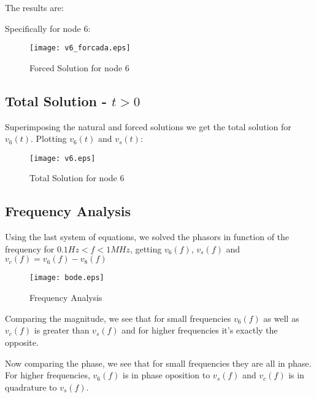 The results are:



Specifically for node 6:

\begin{figure}[h] \centering
\texttt{[image: v6\_forcada.eps]}
\caption{Forced Solution for node 6}
\label{fig:forced}
\end{figure}



\subsection{Total Solution - $t>0$}

Superimposing the natural and forced solutions we get the total solution for $v_{6}(t)$.
Plotting $v_{6}(t)$ and $v_{s}(t)$:

\begin{figure}[h] \centering
\texttt{[image: v6.eps]}
\caption{Total Solution for node 6}
\label{fig:total}
\end{figure}


\subsection{Frequency Analysis}

Using the last system of equations, we solved the phasors in function of the frequency for $0.1Hz<f<1MHz$, getting $v_{6}(f)$, $v_{s}(f)$ and $v_{c}(f)=v_{6}(f)-v_{8}(f)$

\begin{figure}[h] \centering
\texttt{[image: bode.eps]}
\caption{Frequency Analysis}
\label{fig:frequency}
\end{figure}

Comparing the magnitude, we see that for small frequencies  $v_{6}(f)$ as well as $v_{c}(f)$ is greater than $v_{s}(f)$ and for higher frequencies it's exactly the opposite.

Now comparing the phase, we see that for small frequencies they are all in phase. For higher frequencies, $v_{6}(f)$ is in phase oposition to $v_{s}(f)$ and $v_{c}(f)$ is in quadrature to $v_{s}(f)$.
